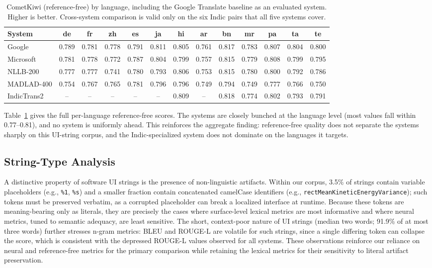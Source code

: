 \documentclass[pdflatex,sn-mathphys-num]{sn-jnl}
\begin{document}
\begin{table}[h]
\centering
\caption{CometKiwi (reference-free) by language, including the Google Translate baseline as an evaluated system. Higher is better. Cross-system comparison is valid only on the six Indic pairs that all five systems cover.}\label{tab:cometkiwi_lang}
\tiny
\setlength{\tabcolsep}{1.5pt}
\begin{tabular}{@{} p{1.8cm} c c c c c c c c c c c c @{}}
\toprule
System & de & fr & zh & es & ja & hi & ar & bn & mr & pa & ta & te \\
\midrule
Google & 0.789 & 0.781 & 0.778 & 0.791 & 0.811 & 0.805 & 0.761 & 0.817 & 0.783 & 0.807 & 0.804 & 0.800 \\
Microsoft & 0.781 & 0.778 & 0.772 & 0.787 & 0.804 & 0.799 & 0.757 & 0.815 & 0.779 & 0.808 & 0.799 & 0.795 \\
NLLB-200 & 0.777 & 0.777 & 0.741 & 0.780 & 0.793 & 0.806 & 0.753 & 0.815 & 0.780 & 0.800 & 0.792 & 0.786 \\
MADLAD-400 & 0.754 & 0.767 & 0.765 & 0.781 & 0.796 & 0.796 & 0.749 & 0.794 & 0.749 & 0.777 & 0.766 & 0.750 \\
IndicTrans2 & -- & -- & -- & -- & -- & 0.809 & -- & 0.818 & 0.774 & 0.802 & 0.793 & 0.791 \\
\bottomrule
\end{tabular}
\end{table}

Table~\ref{tab:cometkiwi_lang} gives the full per-language reference-free scores. The systems are closely bunched at the language level (most values fall within 0.77--0.81), and no system is uniformly ahead. This reinforces the aggregate finding: reference-free quality does not separate the systems sharply on this UI-string corpus, and the Indic-specialized system does not dominate on the languages it targets.

\subsection{String-Type Analysis}

A distinctive property of software UI strings is the presence of non-linguistic artifacts. Within our corpus, 3.5\% of strings contain variable placeholders (e.g., \texttt{\%1}, \texttt{\%s}) and a smaller fraction contain concatenated camelCase identifiers (e.g., \texttt{rectMeanKineticEnergyVariance}); such tokens must be preserved verbatim, as a corrupted placeholder can break a localized interface at runtime. Because these tokens are meaning-bearing only as literals, they are precisely the cases where surface-level lexical metrics are most informative and where neural metrics, tuned to semantic adequacy, are least sensitive. The short, context-poor nature of UI strings (median two words; 91.9\% of at most three words) further stresses n-gram metrics: BLEU and ROUGE-L are volatile for such strings, since a single differing token can collapse the score, which is consistent with the depressed ROUGE-L values observed for all systems. These observations reinforce our reliance on neural and reference-free metrics for the primary comparison while retaining the lexical metrics for their sensitivity to literal artifact preservation.
\end{document}
